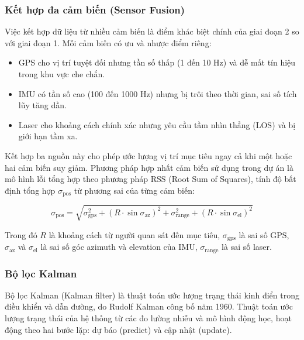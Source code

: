 \subsubsection{Kết hợp đa cảm biến (Sensor Fusion)}

\hspace{0.5cm} Việc kết hợp dữ liệu từ nhiều cảm biến là điểm khác biệt chính của giai đoạn 2 so với giai đoạn 1. Mỗi cảm biến có ưu và nhược điểm riêng:

\begin{itemize}
    \item GPS cho vị trí tuyệt đối nhưng tần số thấp (1 đến 10 Hz) và dễ mất tín hiệu trong khu vực che chắn.
    \item IMU có tần số cao (100 đến 1000 Hz) nhưng bị trôi theo thời gian, sai số tích lũy tăng dần.
    \item Laser cho khoảng cách chính xác nhưng yêu cầu tầm nhìn thẳng (LOS) và bị giới hạn tầm xa.
\end{itemize}

Kết hợp ba nguồn này cho phép ước lượng vị trí mục tiêu ngay cả khi một hoặc hai cảm biến suy giảm. Phương pháp hợp nhất cảm biến sử dụng trong dự án là mô hình lỗi tổng hợp theo phương pháp RSS (Root Sum of Squares), tính độ bất định tổng hợp $\sigma_{\text{pos}}$ từ phương sai của từng cảm biến:

\begin{equation}
\sigma_{\text{pos}} = \sqrt{\sigma_{\text{gps}}^2 + (R \cdot \sin\sigma_{\text{az}})^2 + \sigma_{\text{range}}^2 + (R \cdot \sin\sigma_{\text{el}})^2}
\end{equation}

Trong đó $R$ là khoảng cách từ người quan sát đến mục tiêu, $\sigma_{\text{gps}}$ là sai số GPS, $\sigma_{\text{az}}$ và $\sigma_{\text{el}}$ là sai số góc azimuth và elevation của IMU, $\sigma_{\text{range}}$ là sai số laser.

\subsubsection{Bộ lọc Kalman}

\hspace{0.5cm} Bộ lọc Kalman (Kalman filter) là thuật toán ước lượng trạng thái kinh điển trong điều khiển và dẫn đường, do Rudolf Kalman công bố năm 1960. Thuật toán ước lượng trạng thái của hệ thống từ các đo lường nhiễu và mô hình động học, hoạt động theo hai bước lặp: dự báo (predict) và cập nhật (update).

